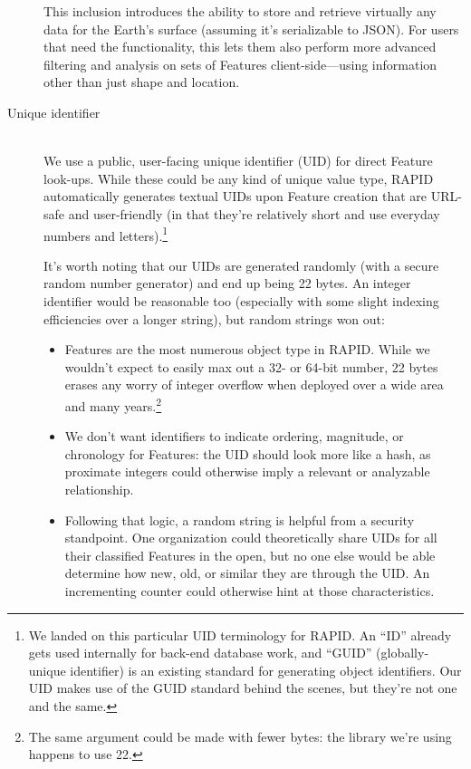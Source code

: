 \begin{description}
  This inclusion introduces the ability to store and retrieve virtually any data for the Earth's surface (assuming it's serializable to JSON). For users that need the functionality, this lets them also perform more advanced filtering and analysis on sets of Features client-side---using information other than just shape and location.
  
  \item[Unique identifier] \hfill \\
  We use a public, user-facing unique identifier (UID) for direct Feature look-ups. While these could be any kind of unique value type, RAPID automatically generates textual UIDs upon Feature creation that are URL-safe and user-friendly (in that they're relatively short and use everyday numbers and letters).\footnote{We landed on this particular UID terminology for RAPID. An ``ID'' already gets used internally for back-end database work, and ``GUID'' (globally-unique identifier) is an existing standard for generating object identifiers. Our UID makes use of the GUID standard behind the scenes, but they're not one and the same.}
  
  It's worth noting that our UIDs are generated randomly (with a secure random number generator) and end up being 22 bytes. An integer identifier would be reasonable too (especially with some slight indexing efficiencies over a longer string), but random strings won out:
  
  \begin{itemize}
  \item Features are the most numerous object type in RAPID. While we wouldn't expect to easily max out a 32- or 64-bit number, 22 bytes erases any worry of integer overflow when deployed over a wide area and many years.\footnote{The same argument could be made with fewer bytes: the library we're using happens to use 22.}
  \item We don't want identifiers to indicate ordering, magnitude, or chronology for Features: the UID should look more like a hash, as proximate integers could otherwise imply a relevant or analyzable relationship.
  \item Following that logic, a random string is helpful from a security standpoint. One organization could theoretically share UIDs for all their classified Features in the open, but no one else would be able determine how new, old, or similar they are through the UID. An incrementing counter could otherwise hint at those characteristics.
\end{itemize}
  

\end{description}

